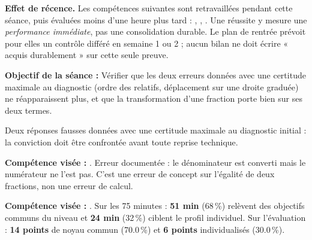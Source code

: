 \documentclass[10pt,a4paper]{article}
\begin{document}
\begin{warningbox}\textbf{Effet de récence.} Les compétences suivantes sont retravaillées pendant cette séance, puis évaluées moins d'une heure plus tard : , , . Une réussite y mesure une \emph{performance immédiate}, pas une consolidation durable. Le plan de rentrée prévoit pour elles un contrôle différé en semaine 1 ou 2 ; aucun bilan ne doit écrire « acquis durablement » sur cette seule preuve.\end{warningbox}
\begin{goalbox}\textbf{Objectif de la séance :} Vérifier que les deux erreurs données avec une certitude maximale au diagnostic (ordre des relatifs, déplacement sur une droite graduée) ne réapparaissent plus, et que la transformation d'une fraction porte bien sur ses deux termes.\end{goalbox}
Deux réponses fausses données avec une certitude maximale au diagnostic initial : la conviction doit être confrontée avant toute reprise technique.
\par\vspace{1mm}\textbf{Compétence visée :} .
Erreur documentée : le dénominateur est converti mais le numérateur ne l'est pas. C'est une erreur de concept sur l'égalité de deux fractions, non une erreur de calcul.
\par\vspace{1mm}\textbf{Compétence visée :} .
Sur les 75 minutes : \textbf{51 min} (68\,\%) relèvent des objectifs communs du niveau et \textbf{24 min} (32\,\%) ciblent le profil individuel. Sur l'évaluation : \textbf{14 points} de noyau commun (70.0\,\%) et \textbf{6 points} individualisés (30.0\,\%).
\newpage{}
\end{document}
